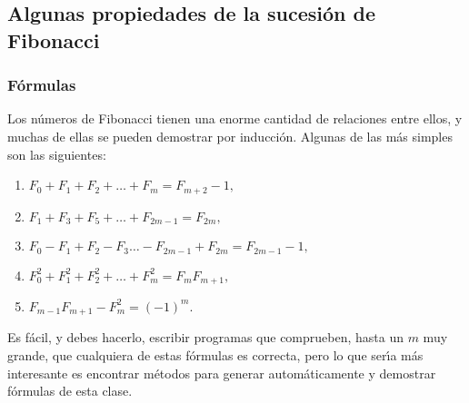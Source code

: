 \subsection{Algunas propiedades de la sucesi\'on de Fibonacci}


\subsubsection{F\'ormulas}



Los n\'umeros de Fibonacci tienen una enorme cantidad de relaciones entre ellos,
y muchas de ellas se pueden demostrar por inducci\'on. Algunas de las m\'as
simples son las siguientes:

\begin{enumerate}
 \item\hfill $F_0+F_1+F_2+\dots+F_m=F_{m+2}-1,$\hfill\mbox{}

 \item\hfill $F_1+F_3+F_5+\dots+F_{2m-1}=F_{2m},$\hfill\mbox{}
 
 \item\hfill $F_0-F_1+F_2-F_3\dots-F_{2m-1}+F_{2m}=F_{2m-1}-1,$\hfill\mbox{}
 
 \item\hfill $F_0^2+F_1^2+F_2^2+\dots+F_m^2=F_{m}F_{m+1},$\hfill\mbox{}
 
 \item\hfill $F_{m-1}F_{m+1}-F_m^2=(-1)^m.$\hfill\mbox{}
 \end{enumerate}

 \begin{ejer}
Es f\'acil, y debes hacerlo,  escribir programas que comprueben, hasta un $m$
muy grande, que cualquiera de estas f\'ormulas es correcta, pero lo que
ser\'{\i}a m\'as interesante es encontrar m\'etodos para generar
autom\'aticamente y demostrar  f\'ormulas de esta clase.
\end{ejer}

